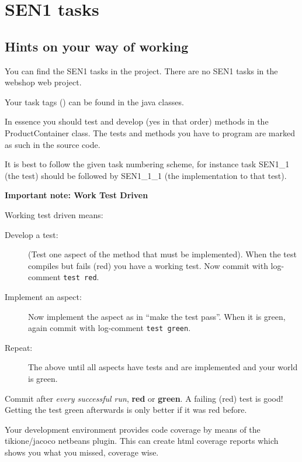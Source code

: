 \section{SEN1 tasks}

\subsection{Hints on your way of working}
You can find the SEN1 tasks in the  project.
There are no SEN1 tasks in the webshop web project.

Your task tags () can be found in the java classes. 

In essence you should test and develop (yes in that order) 
methods in the ProductContainer class. The tests and methods
you have to program are marked as such in the source code.

It is best to follow the given task numbering scheme, for instance task
SEN1\_1 (the test) should be followed by SEN1\_1\_1 (the implementation
to that test).

\begin{center}
{\large\bf\sffamily Important note: Work Test Driven}
\end{center}

Working test driven means:
\begin{description}
\item [Develop a test:] (Test one aspect of the method that must be
  implemented). When the test compiles but fails (red) you have a
  working test. Now commit with  log-comment \texttt{test {\color{red}red}}.
  
\item[Implement an aspect:] Now implement the aspect as in ``make the test
  pass''. When it is green, again commit with  log-comment \texttt{test {\color{green}green}}.
\item[Repeat:] The above until all aspects have tests and are implemented
  and your world is green.
\end{description}

\begin{center}
{\large\sffamily{}Commit after \textit{every successful run},  \textbf{red} or
  \textbf{green}. A failing (red) test is good!\\Getting the test green
  afterwards is only better if it was red before.}
\end{center}

Your development environment provides code coverage by means of the
tikione/jacoco netbeans plugin. This can create html coverage reports
which shows you what you missed, coverage wise.


